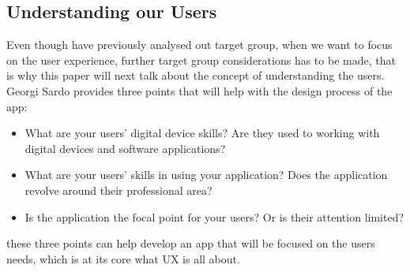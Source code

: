 \subsection{Understanding our Users}
Even though have previously analysed out target group, when we want to focus on the user experience, further target group considerations has to be made, that is why this paper will next talk about the concept of understanding the users. Georgi Sardo provides three points that will help with the design process of the app:
\begin{itemize}
\item What are your users’ digital device skills? Are they used to working with digital devices and software applications?\cite{Sardo}
\item What are your users’ skills in using your application? Does the application revolve around their professional area?\cite{Sardo}
\item Is the application the focal point for your users? Or is their attention limited?\cite{Sardo}
\end{itemize}
these three points can help develop an app that will be focused on the users needs, which is at its core what UX is all about.